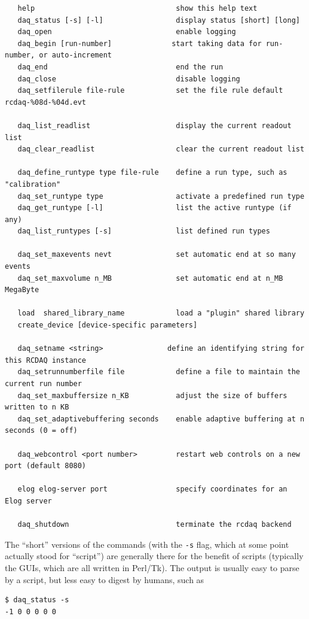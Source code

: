\documentclass{article}[11pt]
\begin{document}
\begin{verbatim}
   help                                 show this help text
   daq_status [-s] [-l]                 display status [short] [long]
   daq_open                             enable logging
   daq_begin [run-number]              start taking data for run-number, or auto-increment
   daq_end                              end the run
   daq_close                            disable logging
   daq_setfilerule file-rule            set the file rule default rcdaq-%08d-%04d.evt

   daq_list_readlist                    display the current readout list
   daq_clear_readlist                   clear the current readout list

   daq_define_runtype type file-rule    define a run type, such as "calibration"
   daq_set_runtype type                 activate a predefined run type
   daq_get_runtype [-l]                 list the active runtype (if any)
   daq_list_runtypes [-s]               list defined run types

   daq_set_maxevents nevt               set automatic end at so many events
   daq_set_maxvolume n_MB               set automatic end at n_MB MegaByte

   load  shared_library_name            load a "plugin" shared library
   create_device [device-specific parameters]

   daq_setname <string>               define an identifying string for this RCDAQ instance
   daq_setrunnumberfile file            define a file to maintain the current run number
   daq_set_maxbuffersize n_KB           adjust the size of buffers written to n KB
   daq_set_adaptivebuffering seconds    enable adaptive buffering at n seconds (0 = off)

   daq_webcontrol <port number>         restart web controls on a new port (default 8080)

   elog elog-server port                specify coordinates for an Elog server

   daq_shutdown                         terminate the rcdaq backend
\end{verbatim} 

The ``short'' versions of the commands (with the \verb|-s| flag, which
at some point actually stood for ``script'') are generally there for
the benefit of scripts (typically the GUIs, which are all written in
Perl/Tk). The output is  usually easy to parse by a script, but less easy
to digest by humans, such as

\begin{verbatim}
$ daq_status -s
-1 0 0 0 0 0 
\end{verbatim}
\end{document}
